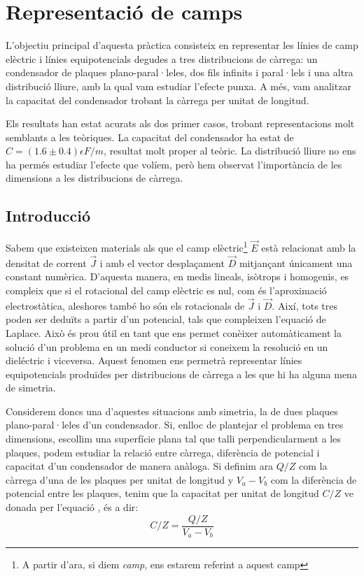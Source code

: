 \chapter{Representació de camps}
\begin{resum}
	L'objectiu principal d'aquesta pràctica consisteix en representar les línies de camp elèctric i línies equipotencials degudes a tres distribucions de càrrega: un condensador de plaques plano-paral·leles, dos fils infinits i paral·lels i una altra distribució lliure, amb la qual vam estudiar l'efecte punxa. A més, vam analitzar la capacitat del condensador trobant la càrrega per unitat de longitud.
	
	Els resultats han estat acurats als dos primer casos, trobant representacions molt semblants a les teòriques. La capacitat del condensador ha estat de $C=(1.6\pm0.4)\epsilon F/m$, resultat molt proper al teòric. La distribució lliure no ens ha permés estudiar l'efecte que volíem, però hem observat l'importància de les dimensions a les distribucions de càrrega.
\end{resum}

\section{Introducció}
Sabem que existeixen materials als que el camp elèctric\footnote{A partir d'ara, si diem \textit{camp}, ens estarem referint a aquest camp} $\vec{E}$ està relacionat amb la densitat de corrent $\vec{J}$ i amb el vector desplaçament $\vec{D}$ mitjançant únicament una constant numèrica. D'aquesta manera, en medis lineals, isòtrops i homogenis, es compleix que si el rotacional del camp elèctric es nul, com és l'aproximació electrostàtica, aleshores també ho són els rotacionals de $\vec{J}$ i $\vec{D}$. Així, tots tres poden ser deduïts a partir d'un potencial, tals que compleixen l'equació de Laplace. Això és prou útil en tant que ens permet conèixer automàticament la solució d'un problema en un medi conductor si coneixem la resolució en un dieléctric i viceversa. Aquest fenomen ens permetrà representar línies equipotencials produïdes per distribucions de càrrega a les que hi ha alguna mena de simetria.

Considerem doncs una d'aquestes situacions amb simetria, la de dues plaques plano-paral·leles d'un condensador. Si, enlloc de plantejar el problema en tres dimensions, escollim una superfície plana tal que talli perpendicularment a les plaques, podem estudiar la relació entre càrrega, diferència de potencial i capacitat d'un condensador de manera anàloga. Si definim ara $Q/Z$ com la càrrega d'una de les plaques per unitat de longitud y $V_a-V_b$ com la diferència de potencial entre les plaques, tenim que la capacitat per unitat de longitud $C/Z$ ve donada per l'equació , és a dir:
\begin{equation} \label{camps1}
C/Z=\frac{Q/Z}{V_a-V_b}
\end{equation}

